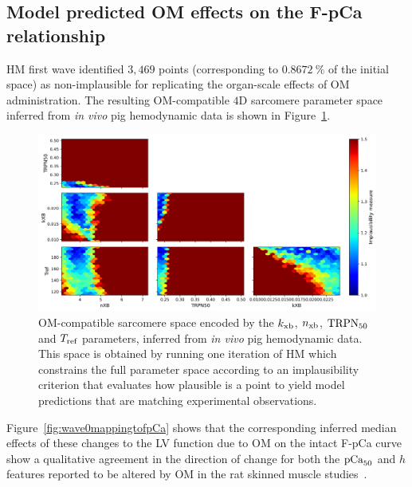 %
%
%
\subsection{Model predicted OM effects on the F-pCa relationship}\label{sec:ch5inferringomeffectsfpcawholeorganresults}
HM first wave identified $3,469$ points (corresponding to $\SI{0.8672}{\percent}$ of the initial space) as non-implausible for replicating the organ-scale effects of OM administration. The resulting OM-compatible $4$D sarcomere parameter space inferred from \textit{in vivo} pig hemodynamic data is shown in Figure~\ref{fig:wave0}. 

\begin{figure}[!ht]
    \myfloatalign
    \includegraphics[width=\textwidth]{figures/chapter05/Fig1.png}
    \caption{OM-compatible sarcomere space encoded by the $k_{\textrm{xb}}$, $n_{\textrm{xb}}$, $\textrm{TRPN}_{50}$ and $T_{\textrm{ref}}$ parameters, inferred from \textit{in vivo} pig hemodynamic data. This space is obtained by running one iteration of HM which constrains the full parameter space according to an implausibility criterion that evaluates how plausible is a point to yield model predictions that are matching experimental observations.}
    \label{fig:wave0}
\end{figure}

\vspace{0.2cm}
Figure~\ref{fig:wave0mappingtofpCa} shows that the corresponding inferred median effects of these changes to the LV function due to OM on the intact F-pCa curve show a qualitative agreement in the direction of change for both the $\textrm{pCa}_{50}$ and $h$ features reported to be altered by OM in the rat skinned muscle studies~\cite{Nagy:2015, Kampourakis:2018, Kieu:2019}.


